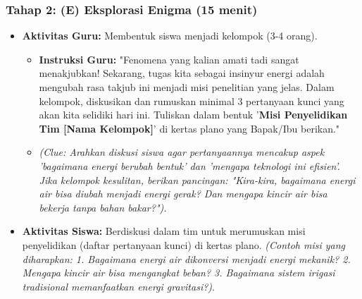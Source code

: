 \documentclass[12pt,a4paper]{article}
\begin{document}
\subsubsection{Tahap 2: (E) Eksplorasi Enigma (15 menit)}
\begin{itemize}
\item \textbf{Aktivitas Guru:} Membentuk siswa menjadi kelompok (3-4 orang).
    \begin{itemize}
    \item \textbf{Instruksi Guru:} "Fenomena yang kalian amati tadi sangat menakjubkan! Sekarang, tugas kita sebagai insinyur energi adalah mengubah rasa takjub ini menjadi misi penelitian yang jelas. Dalam kelompok, diskusikan dan rumuskan minimal 3 pertanyaan kunci yang akan kita selidiki hari ini. Tuliskan dalam bentuk '\textbf{Misi Penyelidikan Tim [Nama Kelompok]}' di kertas plano yang Bapak/Ibu berikan."
    \item \textit{(Clue: Arahkan diskusi siswa agar pertanyaannya mencakup aspek 'bagaimana energi berubah bentuk' dan 'mengapa teknologi ini efisien'. Jika kelompok kesulitan, berikan pancingan: "Kira-kira, bagaimana energi air bisa diubah menjadi energi gerak? Dan mengapa kincir air bisa bekerja tanpa bahan bakar?").}
    \end{itemize}
\item \textbf{Aktivitas Siswa:} Berdiskusi dalam tim untuk merumuskan misi penyelidikan (daftar pertanyaan kunci) di kertas plano. \textit{(Contoh misi yang diharapkan: 1. Bagaimana energi air dikonversi menjadi energi mekanik? 2. Mengapa kincir air bisa mengangkat beban? 3. Bagaimana sistem irigasi tradisional memanfaatkan energi gravitasi?)}.
\end{itemize}
\end{document}
